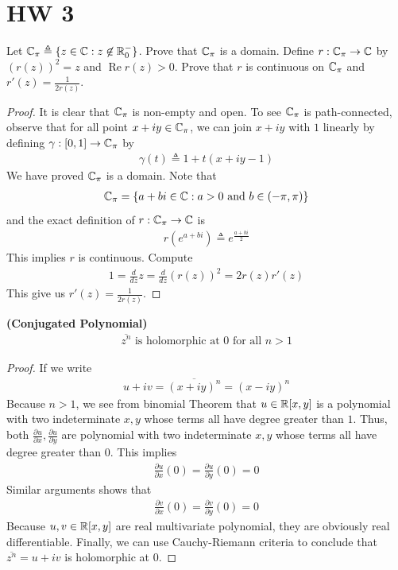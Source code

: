\documentclass{report}
\begin{document}
\section{HW 3}
\begin{question}{}{}
Let $\mathbb{C}_{\pi}\triangleq \{ z\in\mathbb{C}:z\not\in\mathbb{R}^-_0 \}$. Prove that $\mathbb{C}_\pi$ is a domain. Define $r:\mathbb{C}_\pi\rightarrow \mathbb{C}$ by  $(r(z))^2=z$ and $\operatorname{Re}r(z)>0$. Prove that $r$ is continuous on $\mathbb{C}_\pi$ and $r'(z)=\frac{1}{2r(z)}$. 
\end{question}
\begin{proof}
It is clear that $\mathbb{C}_\pi$ is non-empty and open. To see $\mathbb{C}_\pi$ is path-connected, observe that for all point $x+iy \in\mathbb{C}_\pi$, we can join $x+iy$ with  $1$ linearly by defining $\gamma :[0,1]\rightarrow \mathbb{C}_\pi$ by  
\begin{align*}
\gamma (t)\triangleq 1+t(x+iy-1)
\end{align*}
We have proved $\mathbb{C}_\pi$ is a domain. Note that 
\begin{align*}
\mathbb{C}_\pi=\{ a+b i\in\mathbb{C}: a>0\text{ and }b \in (-\pi, \pi) \}
\end{align*}
and the exact definition of $r:\mathbb{C}_\pi\rightarrow \mathbb{C}$ is 
\begin{align*}
r(e^{a+b i})\triangleq e^{\frac{a+b i}{2}}
\end{align*}
This implies $r$ is continuous. Compute
 \begin{align*}
1=\frac{d}{dz}z= \frac{d}{dz}(r(z))^2=2r(z)r'(z)
\end{align*}
This give us $r'(z)=\frac{1}{2 r(z)}$. 
\end{proof}
\begin{theorem}
\label{CP}
\textbf{(Conjugated Polynomial)} 
\begin{align*}
\overline{z^n}\text{ is holomorphic at $0$ for all }n>1
\end{align*}
\end{theorem}
\begin{proof}
If we write 
\begin{align*}
u+iv=\overline{(x+iy)^n}=(x-iy)^n
\end{align*}
Because $n>1$, we see from binomial Theorem that $u \in \mathbb{R}[x,y]$ is a polynomial with two indeterminate $x,y$ whose terms all have degree greater than $1$. Thus, both  $\frac{\partial u}{\partial x},\frac{\partial u}{\partial y}$ are polynomial with two indeterminate $x,y$ whose terms all have degree greater than  $0$. This implies 
\begin{align*}
\frac{\partial u}{\partial x}(0)=\frac{\partial u}{\partial  y}(0)=0
\end{align*}
Similar arguments shows that 
\begin{align*}
\frac{\partial v}{\partial x}(0)=\frac{\partial v}{\partial y}(0)=0
\end{align*}
Because $u,v\in\mathbb{R}[x,y]$ are real multivariate polynomial, they are obviously real differentiable. Finally, we can use Cauchy-Riemann criteria to conclude that $\overline{z^n}=u+iv$ is holomorphic at $0$.
\end{proof}
\end{document}
